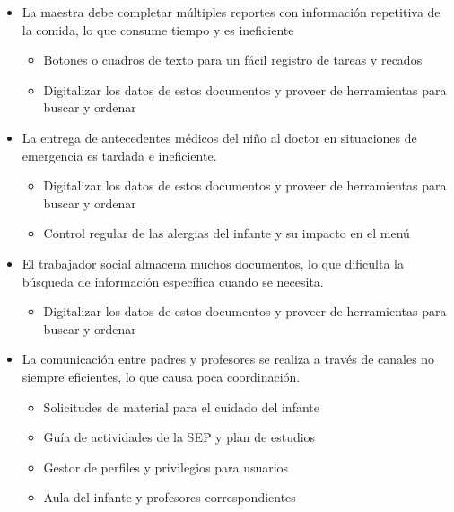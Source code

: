 \documentclass{article}
\begin{document}
\begin{itemize}
	\item   La maestra debe completar múltiples reportes con información repetitiva de la comida, lo que consume tiempo y es ineficiente
	      \begin{itemize}
		      \item Botones o cuadros de texto para un fácil registro de tareas y recados
		      \item Digitalizar los datos de estos documentos y proveer de herramientas para buscar y ordenar
	      \end{itemize}

	\item  La entrega de antecedentes médicos del niño al doctor en situaciones de emergencia es tardada e ineficiente.
	      \begin{itemize}
		      \item Digitalizar los datos de estos documentos y proveer de herramientas para buscar y ordenar
		      \item Control regular de las alergias del infante y su impacto en el menú
	      \end{itemize}

	\item  El trabajador social almacena muchos documentos, lo que dificulta la búsqueda de información específica cuando se necesita.
	      \begin{itemize}
		      \item Digitalizar los datos de estos documentos y proveer de herramientas para buscar y ordenar
	      \end{itemize}

	\item  La comunicación entre padres y profesores se realiza a través de canales no siempre eficientes, lo que causa poca coordinación.
	      \begin{itemize}
		      \item Solicitudes de material para el cuidado del infante
		      \item Guía de actividades de la SEP y plan de estudios
		      \item Gestor de perfiles y privilegios para usuarios
		      \item Aula del infante y profesores correspondientes
	      \end{itemize}


\end{itemize}
\end{document}
